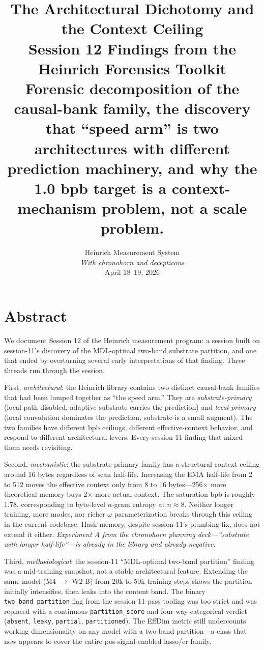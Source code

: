 \documentclass[11pt,openany]{book}
\title{\vspace{-2em}
  The Architectural Dichotomy and the Context Ceiling\\
  \vspace{0.3em}
  \large{Session 12 Findings from the Heinrich Forensics Toolkit}\\
  \vspace{0.2em}
  \normalsize{Forensic decomposition of the causal-bank family, the discovery
              that ``speed arm'' is two architectures with different prediction
              machinery, and why the 1.0 bpb target is a context-mechanism
              problem, not a scale problem.}
}
\author{Heinrich Measurement System\\
\textit{With chronohorn and decepticons}\\
April 18--19, 2026}
\date{}
\begin{document}
\frontmatter
\maketitle

\chapter*{Abstract}

We document Session 12 of the Heinrich measurement program: a session built
on session-11's discovery of the MDL-optimal two-band substrate partition, and
one that ended by overturning several early interpretations of that finding.
Three threads run through the session.

First, \emph{architectural}: the Heinrich library contains two distinct
causal-bank families that had been lumped together as ``the speed arm.'' They
are \emph{substrate-primary} (local path disabled, adaptive substrate carries
the prediction) and \emph{local-primary} (local convolution dominates the
prediction, substrate is a small augment). The two families have different
bpb ceilings, different effective-context behavior, and respond to different
architectural levers. Every session-11 finding that mixed them needs revisiting.

Second, \emph{mechanistic}: the substrate-primary family has a structural
context ceiling around 16 bytes regardless of scan half-life. Increasing the
EMA half-life from 2 to 512 moves the effective context only from 8 to 16
bytes---256$\times$ more theoretical memory buys 2$\times$ more actual
context. The saturation bpb is roughly 1.78, corresponding to byte-level
$n$-gram entropy at $n\approx8$. Neither longer training, more modes, nor
richer $\omega$ parameterization breaks through this ceiling in the current
codebase. Hash memory, despite session-11's plumbing fix, does not extend it
either. \emph{Experiment A from the chronohorn planning deck---``substrate
with longer half-life''---is already in the library and already negative.}

Third, \emph{methodological}: the session-11 ``MDL-optimal two-band partition''
finding was a mid-training snapshot, not a stable architectural feature.
Extending the same model (M4 $\to$ W2-B) from 20k to 50k training steps
shows the partition initially intensifies, then leaks into the content band.
The binary \texttt{two\_band\_partition} flag from the session-11-pass tooling
was too strict and was replaced with a continuous \texttt{partition\_score}
and four-way categorical verdict (\texttt{absent}, \texttt{leaky},
\texttt{partial}, \texttt{partitioned}). The EffDim metric still undercounts
working dimensionality on any model with a two-band partition---a class that
now appears to cover the entire pos-signal-enabled lasso/cr family.
\end{document}
